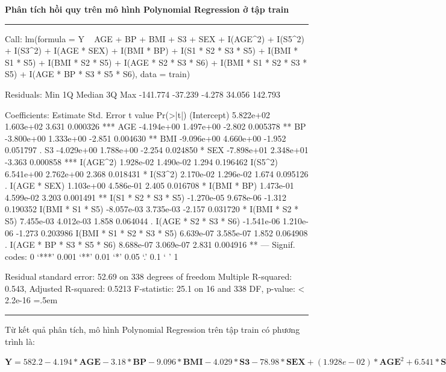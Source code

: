 \documentclass[runningheads]{llncs}
\newenvironment{lcverbatim}
 {\SaveVerbatim{cverb}}
 {\endSaveVerbatim
  \flushleft\fboxrule=0pt\fboxsep=.5em
  \colorbox{cverbbg}{%
    \makebox[\dimexpr\linewidth-2\fboxsep][l]{\BUseVerbatim{cverb}}%
  }
  \endflushleft
}
\begin{document}
\vspace{0.5cm}
\textbf{Phân tích hồi quy trên mô hình Polynomial Regression ở tập train}
\vspace{0.5cm}
\hrule
\begin{lcverbatim}
Call:
lm(formula = Y ~ AGE + BP + BMI + S3 + SEX + I(AGE^2) + I(S5^2) + 
    I(S3^2) + I(AGE * SEX) + I(BMI * BP) + I(S1 * S2 * S3 * S5) + 
    I(BMI * S1 * S5) + I(BMI * S2 * S5) + I(AGE * S2 * S3 * S6) + 
    I(BMI * S1 * S2 * S3 * S5) + I(AGE * BP * S3 * S5 * S6), 
    data = train)

Residuals:
     Min       1Q   Median       3Q      Max 
-141.774  -37.239   -4.278   34.056  142.793 

Coefficients:
                             Estimate Std. Error t value Pr(>|t|)    
(Intercept)                 5.822e+02  1.603e+02   3.631 0.000326 ***
AGE                        -4.194e+00  1.497e+00  -2.802 0.005378 ** 
BP                         -3.800e+00  1.333e+00  -2.851 0.004630 ** 
BMI                        -9.096e+00  4.660e+00  -1.952 0.051797 .  
S3                         -4.029e+00  1.788e+00  -2.254 0.024850 *  
SEX                        -7.898e+01  2.348e+01  -3.363 0.000858 ***
I(AGE^2)                    1.928e-02  1.490e-02   1.294 0.196462    
I(S5^2)                     6.541e+00  2.762e+00   2.368 0.018431 *  
I(S3^2)                     2.170e-02  1.296e-02   1.674 0.095126 .  
I(AGE * SEX)                1.103e+00  4.586e-01   2.405 0.016708 *  
I(BMI * BP)                 1.473e-01  4.599e-02   3.203 0.001491 ** 
I(S1 * S2 * S3 * S5)       -1.270e-05  9.678e-06  -1.312 0.190352    
I(BMI * S1 * S5)           -8.057e-03  3.735e-03  -2.157 0.031720 *  
I(BMI * S2 * S5)            7.455e-03  4.012e-03   1.858 0.064044 .  
I(AGE * S2 * S3 * S6)      -1.541e-06  1.210e-06  -1.273 0.203986    
I(BMI * S1 * S2 * S3 * S5)  6.639e-07  3.585e-07   1.852 0.064908 .  
I(AGE * BP * S3 * S5 * S6)  8.688e-07  3.069e-07   2.831 0.004916 ** 
---
Signif. codes:  0 ‘***’ 0.001 ‘**’ 0.01 ‘*’ 0.05 ‘.’ 0.1 ‘ ’ 1

Residual standard error: 52.69 on 338 degrees of freedom
Multiple R-squared:  0.543,	Adjusted R-squared:  0.5213 
F-statistic:  25.1 on 16 and 338 DF,  p-value: < 2.2e-16
\end{lcverbatim}
\hrule
\vspace{0.5cm}

Từ kết quả phân tích, mô hình Polynomial Regression trên tập train có phương trình là:
\begin{center}
	$\textbf{Y} = 582.2-4.194* \textbf{AGE} -3.18*\textbf{BP} -9.096*\textbf{BMI} -
	4.029*\textbf{S3} - 78.98*\textbf{SEX} + (1.928e-02)*\textbf{AGE}^2 + 6.541*\textbf{S5}^2 + (2.170e-02)*\textbf{S3}^2 + 1.103*\textbf{AGE*SEX} + (1.473e-01)*\textbf{BMI*BP} + (-1.270e-05)*\textbf{S1*S2*S3*S5} + (-8.057e-03)*\textbf{BMI*S1*S5}+(7.455e-03)*\textbf{BMI*S2*S5} +(-1.541e-06)*\textbf{AGE*S2*S3*S6}+(6.639e-07)*\textbf{BMI*S1*S2*S3*S5}+(8.688e-07)*\textbf{AGE*BP*S3*S5*S6}$
\end{center}
\end{document}
